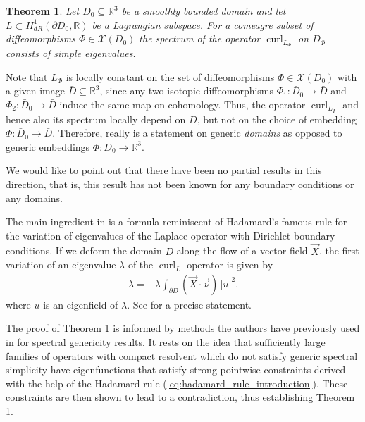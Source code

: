 \documentclass[11pt,reqno]{amsart}
\newtheorem{theorem}{Theorem}[section]
\DeclareMathOperator{\curl}{curl}
\begin{document}
\begin{theorem}
    \label{thm:simple_eigenvalues}
    Let $D_0 \subseteq \mathbb R^3$ be a smoothly bounded domain and let $L\subset H^1_{dR}(\partial D_0,\mathbb R)$ be a Lagrangian subspace. For a comeagre subset of diffeomorphisms $\Phi \in \mathcal X(D_0)$ the spectrum of the operator $\curl_{L_\Phi}$ on $D_\Phi$ consists of simple eigenvalues.
\end{theorem}

Note that $L_\Phi$ is locally constant on the set of diffeomorphisms $\Phi \in \mathcal X(D_0)$ with a given image $\bar D \subseteq \mathbb R^3$, since any two isotopic diffeomorphisms $\Phi_1: \bar D_0 \to \bar D$ and $\Phi_2: \bar D_0 \to \bar D$ induce the same map on cohomology. Thus, the operator $\curl_{L_\Phi}$ and hence also its spectrum locally depend on $D$, but not on the choice of embedding $\Phi: \bar D_0 \to \bar D$. Therefore,  really is a statement on generic \emph{domains} as opposed to generic embeddings $\Phi: \bar D_0 \to \mathbb R^3$.

We would like to point out that there have been no partial results in this direction, that is, this result has not been known for any boundary conditions or any domains.\par
The main ingredient in  is a formula reminiscent of Hadamard's famous rule for the variation of eigenvalues of the Laplace operator with Dirichlet boundary conditions. If we deform the domain $D$ along the flow of a vector field $\vec X$, the first variation of an eigenvalue $\lambda$ of the $\curl_L$ operator is given by
\begin{align}
    \label{eq:hadamard_rule_introduction}
    \dot \lambda = - \lambda \int_{\partial D} (\vec X \cdot \vec \nu)\,|u|^2.
\end{align}
where $u$ is an eigenfield of $\lambda$. See  for a precise statement.

The proof of Theorem \ref{thm:simple_eigenvalues} is informed by methods the authors have previously used in \cite{GreilhuberKepplinger2023} for spectral genericity results. It rests on the idea that sufficiently large families of operators with compact resolvent which do not satisfy generic spectral simplicity have eigenfunctions that satisfy strong pointwise constraints derived with the help of the Hadamard rule (\ref{eq:hadamard_rule_introduction}). These constraints are then shown to lead to a contradiction, thus establishing Theorem \ref{thm:simple_eigenvalues}.
\end{document}
